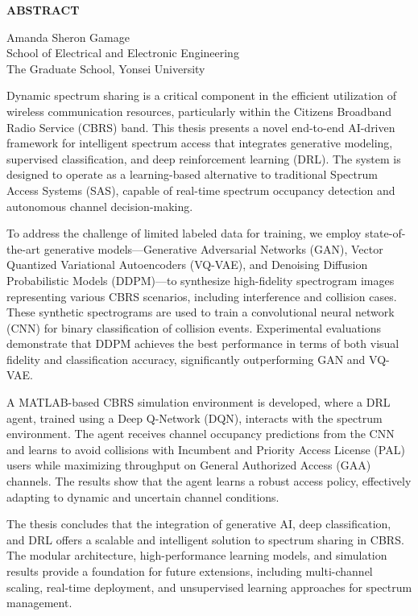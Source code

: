 \clearpage
\begin{centering}
\textbf{ABSTRACT}\\
\vspace{\baselineskip}
\end{centering}

\begin{flushright}
     Amanda Sheron Gamage \\
    School of Electrical and Electronic Engineering \\
    The Graduate School, Yonsei University
\end{flushright}

Dynamic spectrum sharing is a critical component in the efficient utilization of wireless communication resources, particularly within the Citizens Broadband Radio Service (CBRS) band. This thesis presents a novel end-to-end AI-driven framework for intelligent spectrum access that integrates generative modeling, supervised classification, and deep reinforcement learning (DRL). The system is designed to operate as a learning-based alternative to traditional Spectrum Access Systems (SAS), capable of real-time spectrum occupancy detection and autonomous channel decision-making.

To address the challenge of limited labeled data for training, we employ state-of-the-art generative models—Generative Adversarial Networks (GAN), Vector Quantized Variational Autoencoders (VQ-VAE), and Denoising Diffusion Probabilistic Models (DDPM)—to synthesize high-fidelity spectrogram images representing various CBRS scenarios, including interference and collision cases. These synthetic spectrograms are used to train a convolutional neural network (CNN) for binary classification of collision events. Experimental evaluations demonstrate that DDPM achieves the best performance in terms of both visual fidelity and classification accuracy, significantly outperforming GAN and VQ-VAE.

A MATLAB-based CBRS simulation environment is developed, where a DRL agent, trained using a Deep Q-Network (DQN), interacts with the spectrum environment. The agent receives channel occupancy predictions from the CNN and learns to avoid collisions with Incumbent and Priority Access License (PAL) users while maximizing throughput on General Authorized Access (GAA) channels. The results show that the agent learns a robust access policy, effectively adapting to dynamic and uncertain channel conditions.

The thesis concludes that the integration of generative AI, deep classification, and DRL offers a scalable and intelligent solution to spectrum sharing in CBRS. The modular architecture, high-performance learning models, and simulation results provide a foundation for future extensions, including multi-channel scaling, real-time deployment, and unsupervised learning approaches for spectrum management.


